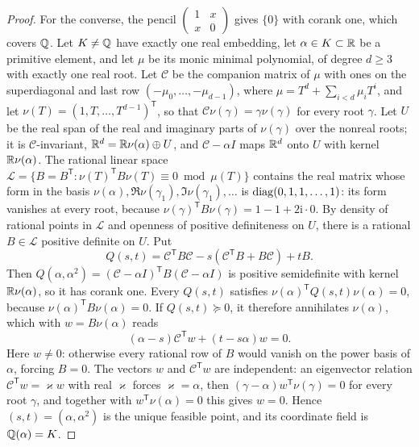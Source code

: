\begin{proof}
For the converse, the pencil $\left(\begin{smallmatrix}1&x\\x&0\end{smallmatrix}
\right)$ gives $\{0\}$ with corank one, which covers $\mathbb Q$. Let $K\ne\mathbb Q$ have
exactly one real embedding, let $\alpha\in K\subset\mathbb R$ be a primitive element,
and let $\mu$ be its monic minimal polynomial, of degree $d\ge3$ with exactly
one real root. Let $\mathcal C$ be the companion matrix of $\mu$ with ones on
the superdiagonal and last row $(-\mu_0,\ldots,-\mu_{d-1})$, where
$\mu=T^d+\sum_{i<d}\mu_iT^i$, and let
$\nu(T)=(1,T,\ldots,T^{d-1})^{\mathsf T}$, so that $\mathcal C\nu(\gamma)=
\gamma\nu(\gamma)$ for every root $\gamma$. Let $U$ be the real span of the
real and imaginary parts of $\nu(\gamma)$ over the nonreal roots; it is
$\mathcal C$-invariant, $\mathbb R^d=\mathbb R\nu(\alpha)\oplus U$, and $\mathcal C-\alpha I$
maps $\mathbb R^d$ onto $U$ with kernel $\mathbb R\nu(\alpha)$. The rational linear space
$\mathcal L=\{B=B^{\mathsf T}:\nu(T)^{\mathsf T}B\nu(T)\equiv0\bmod\mu(T)\}$
contains the real matrix whose form in the basis
$\nu(\alpha),\Re\nu(\gamma_1),\Im\nu(\gamma_1),\ldots$ is
$\operatorname{diag}(0,1,1,\ldots,1)$: its form vanishes at every root, because
$\nu(\gamma)^{\mathsf T}B\nu(\gamma)=1-1+2\mathrm i\cdot0$. By density of
rational points in $\mathcal L$ and openness of positive definiteness on $U$,
there is a rational $B\in\mathcal L$ positive definite on $U$. Put
\[
Q(s,t)=\mathcal C^{\mathsf T}B\mathcal C-s(\mathcal C^{\mathsf T}B+B\mathcal C)+tB .
\]
Then $Q(\alpha,\alpha^2)=(\mathcal C-\alpha I)^{\mathsf T}B(\mathcal C-\alpha I)$
is positive semidefinite with kernel $\mathbb R\nu(\alpha)$, so it has corank one.
Every $Q(s,t)$ satisfies $\nu(\alpha)^{\mathsf T}Q(s,t)\nu(\alpha)=0$, because
$\nu(\alpha)^{\mathsf T}B\nu(\alpha)=0$. If $Q(s,t)\succeq0$, it therefore
annihilates $\nu(\alpha)$, which with $w=B\nu(\alpha)$ reads
\[
(\alpha-s)\mathcal C^{\mathsf T}w+(t-s\alpha)w=0 .
\]
Here $w\ne0$: otherwise every rational row of $B$ would vanish on the power
basis of $\alpha$, forcing $B=0$. The vectors $w$ and $\mathcal C^{\mathsf T}w$
are independent: an eigenvector relation $\mathcal C^{\mathsf T}w=\varkappa w$
with real $\varkappa$ forces $\varkappa=\alpha$, then
$(\gamma-\alpha)w^{\mathsf T}\nu(\gamma)=0$ for every root $\gamma$, and
together with $w^{\mathsf T}\nu(\alpha)=0$ this gives $w=0$. Hence
$(s,t)=(\alpha,\alpha^2)$ is the unique feasible point, and its coordinate
field is $\mathbb Q(\alpha)=K$.
\end{proof}

